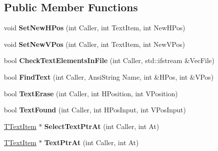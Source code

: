\subsection*{Public Member Functions}
\begin{DoxyCompactItemize}
\item 
\mbox{\label{class_t_text_handler_af766ce44ed9a37e5a723a4ef3968ace0}} 
void {\bfseries Set\+New\+H\+Pos} (int Caller, int Text\+Item, int New\+H\+Pos)
\item 
\mbox{\label{class_t_text_handler_a65f0033d036358a5cb2ec5f4732e64ee}} 
void {\bfseries Set\+New\+V\+Pos} (int Caller, int Text\+Item, int New\+V\+Pos)
\item 
\mbox{\label{class_t_text_handler_a9b78e10ef2f0907a845c0d8ed7ccdede}} 
bool {\bfseries Check\+Text\+Elements\+In\+File} (int Caller, std\+::ifstream \&Vec\+File)
\item 
\mbox{\label{class_t_text_handler_a0fb5dca23fd07e642c611381b6344746}} 
bool {\bfseries Find\+Text} (int Caller, Ansi\+String Name, int \&H\+Pos, int \&V\+Pos)
\item 
\mbox{\label{class_t_text_handler_ad606b1b745b674f0a46cdaa65d09206d}} 
bool {\bfseries Text\+Erase} (int Caller, int H\+Position, int V\+Position)
\item 
\mbox{\label{class_t_text_handler_a2395c6412e763e1b1141b6dc1d524f8b}} 
bool {\bfseries Text\+Found} (int Caller, int H\+Pos\+Input, int V\+Pos\+Input)
\item 
\mbox{\label{class_t_text_handler_a7fa848c67afecfa5fd33d7fee4ab805b}} 
\mbox{\hyperlink{class_t_text_item}{T\+Text\+Item}} $\ast$ {\bfseries Select\+Text\+Ptr\+At} (int Caller, int At)
\item 
\mbox{\label{class_t_text_handler_ac478536f458d9cda8a841953672f6525}} 
\mbox{\hyperlink{class_t_text_item}{T\+Text\+Item}} $\ast$ {\bfseries Text\+Ptr\+At} (int Caller, int At)
\item 
\mbox{\label{class_t_text_handler_a48c65d591fcb76f0a8e86c7f734849b2}} 

\end{DoxyCompactItemize}
